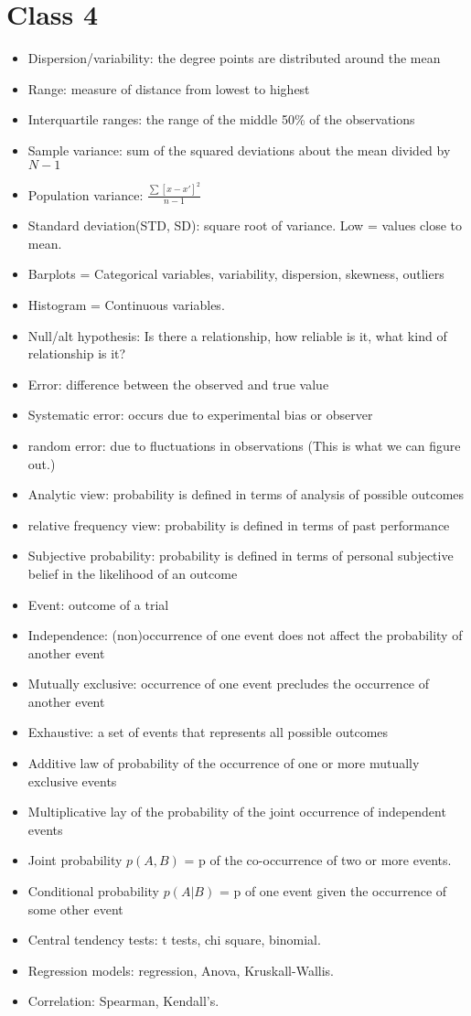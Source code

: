 \documentclass[11pt]{article}
\newenvironment{itemise}{
\begin{itemize}
  \setlength{\itemsep}{1pt}
  \setlength{\parskip}{0pt}
  \setlength{\parsep}{0pt}
}{\end{itemize}}
\begin{document}
\section*{Class 4}
\begin{itemise}
\item Dispersion/variability: the degree points are distributed around the mean
\item Range: measure of distance from lowest to highest
\item Interquartile ranges: the range of the middle 50\% of the observations
\item Sample variance: sum of the squared deviations about the mean divided by $N-1$
\item Population variance: $\frac{\sum[x-x\prime]^2}{n-1}$
\item Standard deviation(STD, SD): square root of variance. Low = values close to mean. 
\item Barplots = Categorical variables, variability, dispersion, skewness, outliers
\item Histogram = Continuous variables.
\item Null/alt hypothesis: Is there a relationship, how reliable is it, what kind of relationship is it?
\item Error: difference between the observed and true value
\item Systematic error: occurs due to experimental bias or observer
\item random error: due to fluctuations in observations (This is what we can figure out.) 
\item Analytic view: probability is defined in terms of analysis of possible outcomes
\item relative frequency view: probability is defined in terms of past performance
\item Subjective probability: probability is defined in terms of personal subjective belief in the likelihood of an outcome
\item Event: outcome of a trial
\item Independence: (non)occurrence of one event does not affect the probability of another event
\item Mutually exclusive: occurrence of one event precludes the occurrence of another event
\item Exhaustive: a set of events that represents all possible outcomes
\item Additive law of probability of the occurrence of one or more mutually exclusive events
\item Multiplicative lay of the probability of the joint occurrence of independent events
\item Joint probability $p(A,B)$ = p of the co-occurrence of two or more events.
\item Conditional probability $p(A|B)$ = p of one event given the occurrence of some other event
\item Central tendency tests: t tests, chi square, binomial.
\item Regression models: regression, Anova, Kruskall-Wallis. 
\item Correlation: Spearman, Kendall's.
\end{itemise}
\end{document}
